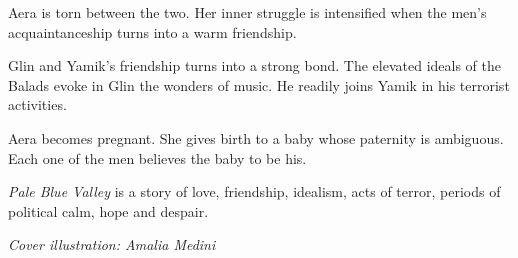 \documentclass[
  spinewidth=0.8325in,
  coverwidth=6in,
  coverheight=9in,
  marklength=0.125in,
  bleedwidth=0.125in,
  12pt
]{bookcover}
\begin{document}
\begin{bookcover}
{{\begin{addmargin}[0.2in]{-0.2in}
Aera is torn between the two. Her inner struggle is intensified when
the men's acquaintanceship turns into a warm friendship.

Glin and Yamik's friendship turns into a strong bond. The elevated
ideals of the Balads evoke in Glin the wonders of music. He readily
joins Yamik in his terrorist activities.

Aera becomes pregnant. She gives birth to a baby whose paternity is
ambiguous. Each one of the men believes the baby to be his.

\emph{Pale Blue Valley} is a story of love, friendship, idealism, acts of
terror, periods of political calm, hope and despair.

\textit{Cover illustration: Amalia Medini}

\end{addmargin}
    }

}


\end{bookcover}
\end{document}
